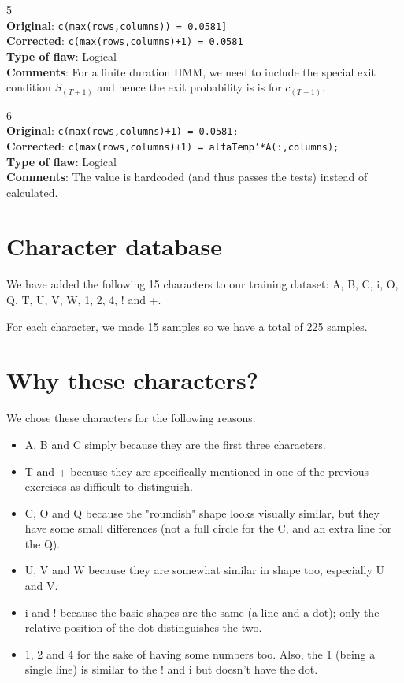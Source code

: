 \large{5}\\
\textbf{Original}: \texttt{c(max(rows,columns)) = 0.0581]}\\
\textbf{Corrected}: \texttt{c(max(rows,columns)+1) = 0.0581}\\
\textbf{Type of flaw}: Logical\\
\textbf{Comments}: For a finite duration HMM, we need to include the special exit condition $S_{(T+1)}$  and hence the exit probability is is for $c_{(T+1)}$.

\large{6}\\
\textbf{Original}: \texttt{c(max(rows,columns)+1) = 0.0581;}\\
\textbf{Corrected}: \texttt{c(max(rows,columns)+1) = alfaTemp'*A(:,columns);}\\
\textbf{Type of flaw}: Logical\\
\textbf{Comments}: The value is hardcoded (and thus passes the tests) instead of calculated.

\section{Character database}
We have added the following 15 characters to our training dataset: A, B, C, i, O, Q, T, U, V, W, 1, 2, 4, ! and +.

For each character, we made 15 samples so we have a total of 225 samples.

\section{Why these characters?}
We chose these characters for the following reasons:
\begin{itemize}
\item A, B and C simply because they are the first three characters.
\item T and + because they are specifically mentioned in one of the previous exercises as difficult to distinguish.
\item C, O and Q because the "roundish" shape looks visually similar, but they have some small differences (not a full circle for the C, and an extra line for the Q).
\item U, V and W because they are somewhat similar in shape too, especially U and V.
\item i and ! because the basic shapes are the same (a line and a dot); only the relative position of the dot distinguishes the two.
\item 1, 2 and 4 for the sake of having some numbers too. Also, the 1 (being a single line) is similar to the ! and i but doesn't have the dot.
\end{itemize}

